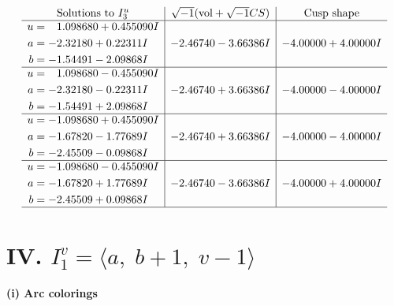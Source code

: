 \documentclass[1p]{elsarticle_modified}
\theoremstyle{definition}
\newcommand{\I}{\sqrt{-1}}
\begin{document}
$$\begin{array}{c|c|c}  
\text{Solutions to }I^u_{3}& \I (\text{vol} + \sqrt{-1}CS) & \text{Cusp shape}\\
 \hline 
\begin{aligned}
u &= \phantom{-}1.098680 + 0.455090 I \\
a &= -2.32180 + 0.22311 I \\
b &= -1.54491 - 2.09868 I\end{aligned}
 & -2.46740 - 3.66386 I & -4.00000 + 4.00000 I \\ \hline\begin{aligned}
u &= \phantom{-}1.098680 - 0.455090 I \\
a &= -2.32180 - 0.22311 I \\
b &= -1.54491 + 2.09868 I\end{aligned}
 & -2.46740 + 3.66386 I & -4.00000 - 4.00000 I \\ \hline\begin{aligned}
u &= -1.098680 + 0.455090 I \\
a &= -1.67820 - 1.77689 I \\
b &= -2.45509 - 0.09868 I\end{aligned}
 & -2.46740 + 3.66386 I & -4.00000 - 4.00000 I \\ \hline\begin{aligned}
u &= -1.098680 - 0.455090 I \\
a &= -1.67820 + 1.77689 I \\
b &= -2.45509 + 0.09868 I\end{aligned}
 & -2.46740 - 3.66386 I & -4.00000 + 4.00000 I\\
 \hline 
 \end{array}$$\newpage\newpage\renewcommand{\arraystretch}{1}
\centering \section*{IV. $I^v_{1}= \langle a,\;b+1,\;v-1 \rangle$}
\flushleft \textbf{(i) Arc colorings}\\
\end{document}
